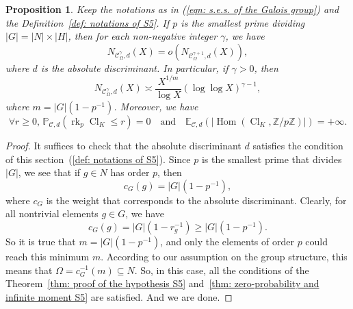 \documentclass[12pt,a4paper]{amsart}
\numberwithin{equation}{section}%
\theoremstyle{plain}%
\newtheorem{proposition}[theorem]{Proposition}%
\theoremstyle{definition}%
\theoremstyle{remark}%
\begin{document}
    \begin{proposition}\label{prop: applications and examples S5}
    	Keep the notations as in (\ref{eqn: s.e.s. of the Galois group}) and the Definition~\ref{def: notations of S5}.
    	If $p$ is the smallest prime dividing $\lvert G\rvert=\lvert N\rvert\times\lvert H\rvert$, then for each non-negative integer $\gamma$, we have
    	\begin{equation*}
    		N_{\mathcal{C}_{\Omega}^{\gamma},d}(X)=o(N_{\mathcal{C}_{\Omega}^{\gamma+1},d}(X)),%
    	\end{equation*}
    	where $d$ is the absolute discriminant.
    	In particular, if $\gamma>0$, then
    	\begin{equation*}
    		N_{\mathcal{C}_{\Omega}^{\gamma},d}(X)\asymp\frac{X^{1/m}}{\log X}(\log\log X)^{\gamma-1},%
    	\end{equation*}
    	where $m=\lvert G\rvert(1-p^{-1})$.
    	Moreover, we have
    	\begin{equation*}
    		\forall r\geq0,\,\mathbb{P}_{\mathcal{C},d}(\operatorname{rk}_{p}\operatorname{Cl}_{K}\leq r)=0%
    		\quad\text{and}\quad%
    		\mathbb{E}_{\mathcal{C},d}(\lvert\operatorname{Hom}(\operatorname{Cl}_{K},\mathbb{Z}/p\mathbb{Z})\rvert)=+\infty.
    	\end{equation*}
    \end{proposition}
    \begin{proof}
    	It suffices to check that the absolute discriminant $d$ satisfies the condition of this section~(\ref{def: notations of S5}).
    	Since $p$ is the smallest prime that divides $\lvert G\rvert$, we see that if $g\in N$ has order $p$, then
    	\begin{equation*}
    		c_{G}(g)=\lvert G\rvert(1-p^{-1}),%
    	\end{equation*}
    	where $c_{G}$ is the weight that corresponds to the absolute discriminant.
    	Clearly, for all nontrivial elements $g\in G$, we have
    	\begin{equation*}
    		c_{G}(g)=\lvert G\rvert(1-r_{g}^{-1})\geq\lvert G\rvert(1-p^{-1}).
    	\end{equation*}
    	So it is true that $m=\lvert G\rvert(1-p^{-1})$, and only the elements of order $p$ could reach this minimum $m$.
    	According to our assumption on the group structure, this means that $\Omega=c_{G}^{-1}(m)\subseteq N$.
    	So, in this case, all the conditions of the Theorem~\ref{thm: proof of the hypothesis S5} and~\ref{thm: zero-probability and infinite moment S5} are satisfied.
    	And we are done.
    \end{proof}
\end{document}
